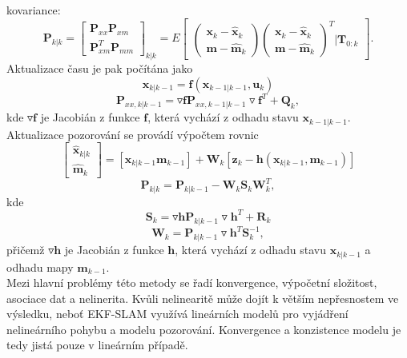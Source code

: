 \documentclass[12pt]{report}
\begin{document}
\indent kovariance:
\begin{equation}
	\textbf{P}_{k|k}=\begin{bmatrix}
	\textbf{P}_{xx} \textbf{P}_{xm}\\\textbf{P}^T_{xm} \textbf{P}_{mm}
	\end{bmatrix}_{k|k}=E\begin{bmatrix}
	\begin{pmatrix}
	\textbf{x}_k-\hat{\textbf{x}}_k\\\textbf{m}-\hat{\textbf{m}}_k
	\end{pmatrix} \begin{pmatrix}
	\textbf{x}_k-\hat{\textbf{x}}_k\\\textbf{m}-\hat{\textbf{m}}_k
	\end{pmatrix}^T |\textbf{T}_{0:k}
	\end{bmatrix}.
\end{equation}
Aktualizace času je pak počítána jako
\begin{equation}
\textbf{\^{x}}_{k|k-1}=\textbf{f}(\textbf{\^{x}}_{k-1|k-1},\textbf{u}_{k})
\end{equation}
\begin{equation}
	\textbf{P}_{xx,k|k-1}=\triangledown\textbf{f}\textbf{P}_{xx,k-1|k-1}\triangledown\textbf{f}^T+\textbf{Q}_k,
\end{equation}
kde $\triangledown\textbf{f}$ je Jacobián z funkce $\textbf{f}$, která vychází z odhadu stavu $\textbf{\^{x}}_{k-1|k-1}$.\\
Aktualizace pozorování se provádí výpočtem rovnic
\begin{equation}
	\begin{bmatrix}
	\hat{\textbf{x}}_{k|k}\\\hat{\textbf{m}}_k
	\end{bmatrix}=
	[\textbf{\^{x}}_{k|k-1}\textbf{\^{m}}_{k-1}]+\textbf{W}_{k}[\textbf{z}_k-\textbf{h}(\textbf{\^{x}}_{k|k-1},\textbf{\^{m}}_{k-1})]
\end{equation}
\begin{equation}
	\textbf{P}_{k|k}=\textbf{P}_{k|k-1}-\textbf{W}_k\textbf{S}_k\textbf{W}^T_k,
\end{equation}
kde 
\begin{equation}
	\textbf{S}_k=\triangledown\textbf{h}\textbf{P}_{k|k-1}\triangledown\textbf{h}^T+\textbf{R}_k
\end{equation}
\begin{equation}
	\textbf{W}_k=\textbf{P}_{k|k-1}\triangledown\textbf{h}^T\textbf{S}^{-1}_k,
\end{equation}
přičemž $\triangledown\textbf{h}$ je Jacobián z funkce $\textbf{h}$, která vychází z odhadu stavu $\textbf{\^{x}}_{k|k-1}$ a odhadu mapy $\textbf{\^{m}}_{k-1}$.\\
\indent Mezi hlavní problémy této metody se řadí konvergence, výpočetní složitost, asociace dat a nelinerita. Kvůli nelinearitě může dojít k větším nepřesnostem ve výsledku, neboť EKF-SLAM využívá lineárních modelů pro vyjádření nelineárního pohybu a modelu pozorování. Konvergence a konzistence modelu je tedy jistá pouze v lineárním případě. 
\end{document}
